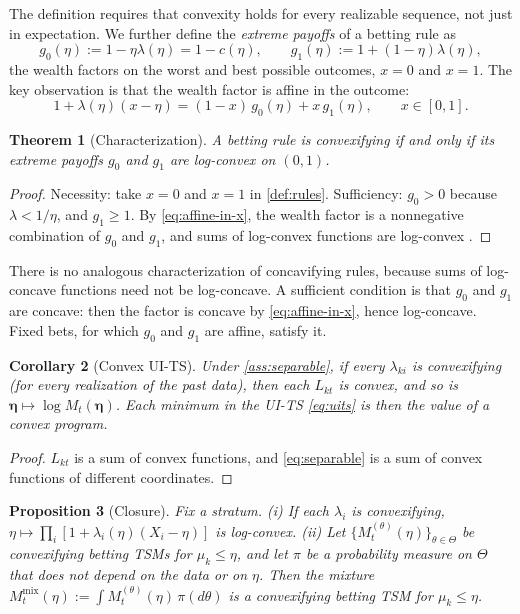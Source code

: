 \documentclass[11pt]{article}
\newcommand{\bs}{\boldsymbol}
\newcommand{\mix}{\mathrm{mix}}
\theoremstyle{plain}
\newtheorem{theorem}{Theorem}
\newtheorem{proposition}[theorem]{Proposition}
\newtheorem{corollary}[theorem]{Corollary}
\theoremstyle{definition}
\theoremstyle{remark}
\begin{document}
The definition requires that convexity holds for every realizable sequence, not just in expectation.
We further define the \emph{extreme payoffs} of a betting rule as
\[
g_0(\eta) := 1-\eta\lambda(\eta) = 1-c(\eta), \qquad g_1(\eta) := 1+(1-\eta)\lambda(\eta),
\]
the wealth factors on the worst and best possible outcomes, $x=0$ and $x=1$.
The key observation is that the wealth factor is affine in the outcome:
\begin{equation}\label{eq:affine-in-x}
1+\lambda(\eta)(x-\eta) = (1-x)\,g_0(\eta) + x\,g_1(\eta), \qquad x\in[0,1].
\end{equation}

\begin{theorem}[Characterization]\label{thm:characterization}
A betting rule is convexifying if and only if its extreme payoffs $g_0$ and $g_1$ are log-convex on $(0,1)$.
\end{theorem}

\begin{proof}
Necessity: take $x=0$ and $x=1$ in \cref{def:rules}.  Sufficiency: $g_0 > 0$ because $\lambda<1/\eta$, and
$g_1\ge1$.  By \eqref{eq:affine-in-x}, the wealth factor is a nonnegative combination of $g_0$ and $g_1$, and sums of
log-convex functions are log-convex \citep[Section 3.5.2]{boyd2004convex}.
\end{proof}

There is no analogous characterization of concavifying rules, because sums of log-concave functions need not be
log-concave.  A sufficient condition is that $g_0$ and $g_1$ are concave: then the factor is concave by
\eqref{eq:affine-in-x}, hence log-concave.  Fixed bets, for which $g_0$ and $g_1$ are affine, satisfy it.

\begin{corollary}[Convex UI-TS]\label{cor:convex-uits}
Under \cref{ass:separable}, if every $\lambda_{ki}$ is convexifying (for every realization of the past data),
then each $L_{kt}$ is convex, and so is $\bs\eta\mapsto\log M_t(\bs\eta)$.  Each minimum in the UI-TS \eqref{eq:uits}
is then the value of a convex program.
\end{corollary}

\begin{proof}
$L_{kt}$ is a sum of convex functions, and \eqref{eq:separable} is a sum of convex functions of different coordinates.
\end{proof}

\begin{proposition}[Closure]\label{prop:closure}
Fix a stratum.  (i) If each $\lambda_i$ is convexifying, $\eta\mapsto\prod_i[1+\lambda_i(\eta)(X_i-\eta)]$ is
log-convex.  (ii) Let $\{M^{(\theta)}_t(\eta)\}_{\theta\in\Theta}$ be convexifying betting TSMs for $\mu_k\le\eta$,
and let $\pi$ be a probability measure on $\Theta$ that does not depend on the data or on $\eta$.
Then the mixture $M^{\mix}_t(\eta) := \int M^{(\theta)}_t(\eta)\,\pi(d\theta)$ is a convexifying betting TSM for
$\mu_k\le\eta$.
\end{proposition}
\end{document}
